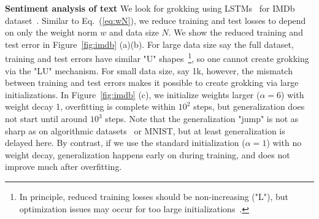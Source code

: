 \documentclass{article} %
\newcommand{\zm}[1]{{\color{black!100!blue} #1}}
\begin{document}


{\bf Sentiment analysis of text} We look for grokking using LSTMs~\citep{hochreiter1997long} for IMDb dataset~\citep{maas2011learning}. Similar to Eq.~(\ref{eq:wN}), we reduce training and test losses to depend on only the weight norm $w$ and data size $N$. We show the reduced training and test error in Figure~\ref{fig:imdb} (a)(b). For large data size say the full dataset, training and test errors have similar "U" shapes~\footnote{\zm{In principle, reduced training losses should be non-increasing ("L"), but optimization issues may occur for too large initializations~\citep{schoenholz2016deep}.}}, so one cannot create grokking via the "LU" mechanism. For small data size, say 1k, however, the mismatch between training and test errors makes it possible to create grokking via large initializations. In Figure~\ref{fig:imdb} (c), we initialize weights larger ($\alpha=6$) with weight decay 1, overfitting is complete within $10^2$ steps, but generalization does not start until around $10^3$ steps. Note that the generalization "jump" is not as sharp as on algorithmic datasets~\citep{power2022grokking} or MNIST, but at least generalization is delayed here. By contrast, if we use the standard initialization ($\alpha=1$) with no weight decay, generalization happens early on during training, and does not improve much after overfitting.
\end{document}

